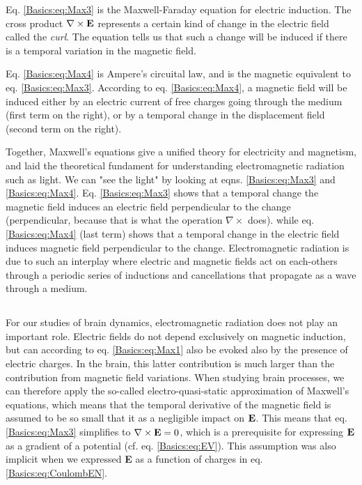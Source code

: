 Eq. \ref{Basics:eq:Max3} is the Maxwell-Faraday equation for electric induction. The cross product $\nabla \times {\bf E}$ represents a certain kind of change in the electric field called the \textit{curl}. The equation tells us that such a change will be induced if there is a temporal variation in the magnetic field. 

Eq.  \ref{Basics:eq:Max4} is Ampere's circuital law, and is the magnetic equivalent to eq. \ref{Basics:eq:Max3}. According to eq. \ref{Basics:eq:Max4}, a magnetic field will be induced either by an electric current of free charges going through the medium (first term on the right), or by a temporal change in the displacement field (second term on the right). 

Together, Maxwell's equations give a unified theory for electricity and magnetism, and laid the theoretical fundament for understanding electromagnetic radiation such as light. We can "see the light" by looking at eqns. \ref{Basics:eq:Max3} and \ref{Basics:eq:Max4}. Eq. \ref{Basics:eq:Max3} shows that a temporal change the magnetic field induces an electric field perpendicular to the change (perpendicular, because that is what the operation $\nabla \times$ does). while eq. \ref{Basics:eq:Max4} (last term) shows that a temporal change in the electric field induces magnetic field perpendicular to the change. Electromagnetic radiation is due to such an interplay where electric and magnetic fields act on each-others through a periodic series of inductions and cancellations that propagate as a wave through a medium. 

\subsection{}
For our studies of brain dynamics, electromagnetic radiation does not play an important role. Electric fields do not depend exclusively on magnetic induction, but can according to eq. \ref{Basics:eq:Max1} also be evoked also by the presence of electric charges. In the brain, this latter contribution is much larger than the contribution from magnetic field variations. When studying brain processes, we can therefore apply the so-called electro-quasi-static approximation of Maxwell's equations, which means that the temporal derivative of the magnetic field is assumed to be so small that it as a negligible impact on ${\bf E}$. This means that eq. \ref{Basics:eq:Max3} simplifies to $\nabla \times {\bf E} = 0$, which is a prerequisite for expressing ${\bf E}$ as a gradient of a potential (cf. eq. \ref{Basics:eq:EV}). This assumption was also implicit when we expressed {\bf E} as a function of charges in eq. \ref{Basics:eq:CoulombEN}. 

